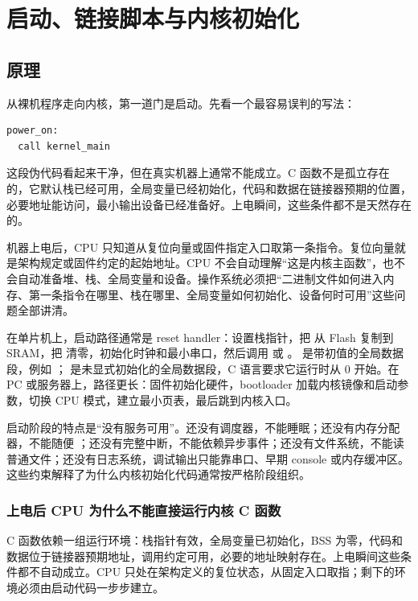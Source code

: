 \chapter{启动、链接脚本与内核初始化}

\section{原理}

从裸机程序走向内核，第一道门是启动。先看一个最容易误判的写法：

\begin{lstlisting}
power_on:
  call kernel_main
\end{lstlisting}

这段伪代码看起来干净，但在真实机器上通常不能成立。C 函数不是孤立存在的，它默认栈已经可用，全局变量已经初始化，代码和数据在链接器预期的位置，必要地址能访问，最小输出设备已经准备好。上电瞬间，这些条件都不是天然存在的。

机器上电后，CPU 只知道从复位向量或固件指定入口取第一条指令。复位向量就是架构规定或固件约定的起始地址。CPU 不会自动理解“这是内核主函数”，也不会自动准备堆、栈、全局变量和设备。操作系统必须把“二进制文件如何进入内存、第一条指令在哪里、栈在哪里、全局变量如何初始化、设备何时可用”这些问题全部讲清。

在单片机上，启动路径通常是 reset handler：设置栈指针，把  从 Flash 复制到 SRAM，把  清零，初始化时钟和最小串口，然后调用  或 。 是带初值的全局数据段，例如 ； 是未显式初始化的全局数据段，C 语言要求它运行时从 0 开始。在 PC 或服务器上，路径更长：固件初始化硬件，bootloader 加载内核镜像和启动参数，切换 CPU 模式，建立最小页表，最后跳到内核入口。

启动阶段的特点是“没有服务可用”。还没有调度器，不能睡眠；还没有内存分配器，不能随便 ；还没有完整中断，不能依赖异步事件；还没有文件系统，不能读普通文件；还没有日志系统，调试输出只能靠串口、早期 console 或内存缓冲区。这些约束解释了为什么内核初始化代码通常按严格阶段组织。

\subsection{上电后 CPU 为什么不能直接运行内核 C 函数}

C 函数依赖一组运行环境：栈指针有效，全局变量已初始化，BSS 为零，代码和数据位于链接器预期地址，调用约定可用，必要的地址映射存在。上电瞬间这些条件都不自动成立。CPU 只处在架构定义的复位状态，从固定入口取指；剩下的环境必须由启动代码一步步建立。

